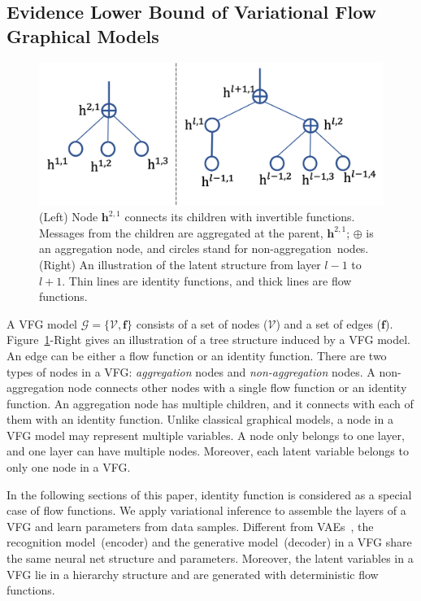 \documentclass[twoside]{article}
\begin{document}
\subsection{Evidence Lower Bound of Variational Flow Graphical Models}
\begin{figure}
\vspace{-0.05in}
\begin{center}
 \includegraphics[width=1.0\linewidth]{fig/tree_node.png}
\end{center}
\vspace{-0.15in}
\caption{\small  (Left)  Node $\mathbf{h}^{2, 1}$ connects its children with invertible functions. Messages from the children are aggregated at the parent, $\mathbf{h}^{2,1}$; $\oplus$ is an aggregation node, and circles stand for non-aggregation~nodes.(Right) An illustration of the latent structure from layer $l-1$ to $l+1$.  Thin lines are identity functions, and thick lines are flow functions.  }
\label{fig:tree}
\vspace{-0.1in}
\end{figure}
A VFG model  $\mathcal{G}=\{\mathcal{V}, \mathbf{f}\} $ consists of a set of nodes ($\mathcal{V}$) and a set of edges ($\mathbf{f}$).
Figure~\ref{fig:tree}-Right gives an illustration of a tree structure induced by a VFG model. An edge can be either a flow function or an identity function. There are two types of nodes in a VFG: \emph{aggregation} nodes and \emph{non-aggregation} nodes. 
A non-aggregation node connects other nodes with a single flow function or an identity function. An aggregation node has multiple children, and it  connects with each of  them with an identity function. 	Unlike classical graphical models, a node in a VFG model may represent multiple variables. A node only belongs to one layer, and one layer can have multiple nodes. Moreover, each latent variable belongs to only one node in a VFG. 


In the following sections of this paper, identity function is considered as a special case of flow functions.
We apply variational inference to assemble the layers of a VFG and learn parameters from data samples. Different from VAEs~\cite{kingma2013auto,rezende2014stochastic}, the recognition model~(encoder) and the generative model~(decoder) in a VFG share the same  neural net structure and parameters. Moreover, the latent variables in a VFG lie in a hierarchy structure and  are generated with deterministic flow functions.
\end{document}
